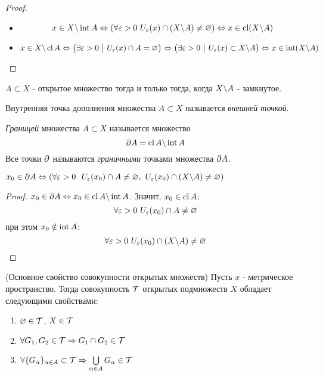 \begin{proof}~
	\begin{itemize}
		\item
		\[
			x \in X \backslash \operatorname{int} A \Leftrightarrow \left(\forall \varepsilon > 0\ U_\varepsilon(x) \cap (X \backslash A) \neq \varnothing\right) \Leftrightarrow x \in \operatorname{cl} (X \backslash A)
		\]
		
		\item
		\[
			x \in X \backslash \operatorname{cl} A \Leftrightarrow \left(\exists \varepsilon > 0 \ \big|\  U_\varepsilon(x) \cap A = \varnothing\right) \Leftrightarrow \left(\exists \varepsilon > 0 \ \big|\  U_\varepsilon(x) \subset X \backslash A\right) \Leftrightarrow x \in \operatorname{int} (X \backslash A)
		\]
	\end{itemize}
\end{proof}

\begin{corollary}
	$A \subset X$ - открытое множество тогда и только тогда, когда $X \backslash A$ - замкнутое.
\end{corollary}

\begin{definition}
	Внутренняя точка дополнения множества $A \subset X$ называется \textit{внешней точкой}.
\end{definition}

\begin{definition}
	\textit{Границей} множества $A \subset X$ называется множество
	\[
		\partial A = \operatorname{cl} A \backslash \operatorname{int} A
	\]
	Все точки $\partial$ называются \textit{граничными} точками множества $\partial A$.
\end{definition}

\begin{lemma}
	$x_0 \in \partial A \Leftrightarrow \left(\forall \varepsilon > 0\ \ U_\varepsilon(x_0) \cap A \neq \varnothing,\ U_\varepsilon(x_0) \cap (X \backslash A) \neq \varnothing\right)$
\end{lemma}

\begin{proof}
	$x_0 \in \partial A \Leftrightarrow x_0 \in \operatorname{cl} A \backslash \operatorname{int} A$. Значит, $x_0 \in \operatorname{cl} A$:
	\[
		\forall \eps > 0\ U_\eps(x_0) \cap A \neq \emptyset
	\]
	при этом $x_0 \notin \operatorname{int} A$:
	\[
		\forall \varepsilon > 0\ U_\varepsilon(x_0) \cap (X \backslash A) \neq \varnothing
	\]
\end{proof}

\begin{theorem} (Основное свойство совокупности открытых множеств) \label{mainProp}
	Пусть $x$ - метрическое пространство. Тогда совокупность $\mathcal{T}$ открытых подмножеств $X$ обладает следующими свойствами:
	\begin{enumerate}
		\item $\varnothing \in \mathcal{T}$, $X \in \mathcal{T}$
		
		\item $\forall G_1, G_2 \in \mathcal{T} \Rightarrow G_1 \cap G_2 \in \mathcal{T}$
		
		\item $\forall \{G_\alpha\}_{\alpha \in A} \subset \mathcal{T} \Rightarrow \bigcup\limits_{\alpha \in A} G_\alpha \in \mathcal{T}$
	\end{enumerate}
\end{theorem}

